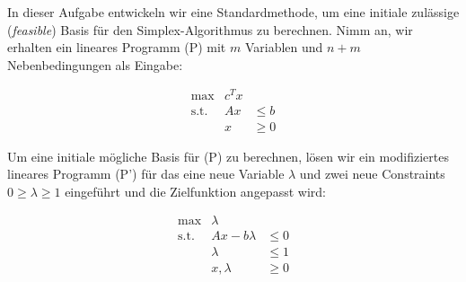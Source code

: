 \documentclass{uebung_cs}
\begin{document}
\begin{aufgabe}
%
%
%
%
	In dieser Aufgabe entwickeln wir eine Standardmethode, um eine initiale zulässige (\textit{feasible}) Basis für den Simplex-Algorithmus zu berechnen. Nimm an, wir erhalten ein lineares Programm (P) mit $m$ Variablen und $n + m$ Nebenbedingungen als Eingabe:
	
	\[
		\begin{array}{rrl}
			\text{max}   &  c^T x &  	    \\
			\text{s.t.}  &	Ax & \leq b \\
						 &	x  & \geq 0
		\end{array}
	\]
	
	Um eine initiale mögliche Basis für (P) zu berechnen, lösen wir ein modifiziertes lineares Programm (P') für das eine neue Variable $\lambda$ und zwei neue Constraints $0 \geq \lambda \geq 1$ eingeführt und die Zielfunktion angepasst wird:
	
	\[
		\begin{array}{rrl}
			\text{max}   &        \lambda & 	   \\
			\text{s.t.}  &	Ax - b\lambda & \leq 0 \\
						 &		  \lambda & \leq 1 \\
						 &	 x, \lambda   & \geq 0
		\end{array}
	\]
	

\end{aufgabe}
\end{document}
